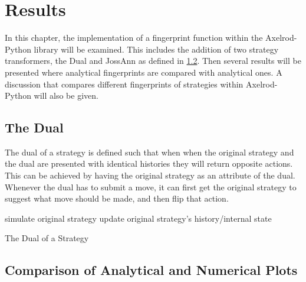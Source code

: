
\chapter{Results}\label{cha:results}

In this chapter, the implementation of a fingerprint function within the Axelrod-Python library will be examined.
This includes the addition of two strategy transformers, the Dual and JossAnn as defined in \ref{}. %
Then several results will be presented where analytical fingerprints are compared with analytical ones.
A discussion that compares different fingerprints of strategies within Axelrod-Python will also be given.

\section{The Dual}
The dual of a strategy is defined such that when when the original strategy and the dual are presented with identical histories they will return opposite actions.
This can be achieved by having the original strategy as an attribute of the dual.
Whenever the dual has to submit a move, it can first get the original strategy to suggest what move should be made, and then flip that action.

\IncMargin{1.5em}
\begin{algorithm}[H]
  simulate original strategy\;
  update original strategy's history/internal state\;
 \caption{The Dual of a Strategy}
\end{algorithm}\DecMargin{1.5em}

\section{Comparison of Analytical and Numerical Plots}

